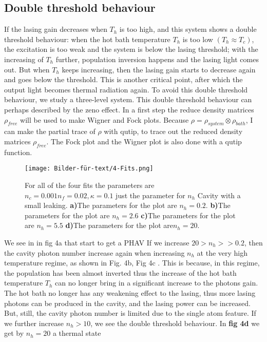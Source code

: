 \documentclass[12pt,a4paper]{article}
\begin{document}
\subsection{Double threshold behaviour}
If the lasing gain decreases when $T_h$ is too high, and this system shows a double threshold behaviour: when the hot bath temperature $T_h$ is
too low $(T_h \approx T_c)$, the excitation is too weak and the system
is below the lasing threshold; with the increasing of $T_h$ further, population inversion happens and the lasing light comes out. But when $T_h$ keeps increasing, then the lasing gain starts to decrease again and goes below the threshold. This is another critical point, after which the output light becomes thermal radiation again.
To avoid this double threshold behaviour, we study a three-level system.
This double threshold behaviour can perhaps described by the zeno effect.
In a first step the reduce density matrices $\rho_{free}$ will be used to make Wigner and Fock plots.
Because $\rho=\rho_{system}\otimes \rho_{bath}$, I can make the partial trace of $\rho$ with qutip, to trace out the reduced density matrices $\rho_{free}$. The Fock plot and the Wigner plot is also done with a qutip function.
\begin{figure}[h!]
\centering
\texttt{[image: Bilder-für-text/4-Fits.png]}
\caption{For all of the four fits the parameters are $n_c=0.001 n_f=0.02,\kappa=0.1$ just the parameter for $n_h$ Cavity with a small leaking.
\textbf{a)}The parameters for the plot are $n_h=0.2 $.
\textbf{b)}The parameters for the plot are $ n_h=2.6$ 
\textbf{c)}The parameters for the plot are $ n_h=5.5$ 
\textbf{d)}The parameters for the plot are$ n_h=20$. 
}
\end{figure}
We see in in fig 4a that start to get a PHAV
If we increase  $20>n_h >>0.2 $,
then the cavity photon number increase again when increasing $n_h$ at the very
high temperature regime, as shown in Fig. 4b, Fig 4c . This is because,
in this regime, the population has been almost inverted
thus the increase of the hot bath temperature $T_h$
can no longer bring in a significant increase to the photons gain.
The hot bath no longer has
any weakening effect to the lasing, thus more lasing photons
can be produced in the cavity, and the lasing power can be
increased. But, still, the cavity photon number is limited due to
the single atom feature.
If we further increase  $n_h >10$, we see the double threshold behaviour. 
In \textbf{fig 4d} we get by $n_h=20$ a thermal state
\end{document}
